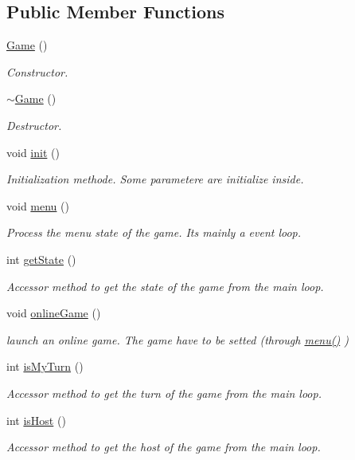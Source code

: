 \subsection*{Public Member Functions}
\begin{DoxyCompactItemize}
\item 
\hyperlink{class_game_ad59df6562a58a614fda24622d3715b65}{Game} ()
\begin{DoxyCompactList}\small\item\em Constructor. \end{DoxyCompactList}\item 
\hyperlink{class_game_ae3d112ca6e0e55150d2fdbc704474530}{$\sim$\+Game} ()
\begin{DoxyCompactList}\small\item\em Destructor. \end{DoxyCompactList}\item 
void \hyperlink{class_game_a6f3a33940524b6ba9d83f627ccb14bbf}{init} ()
\begin{DoxyCompactList}\small\item\em Initialization methode. Some parametere are initialize inside. \end{DoxyCompactList}\item 
void \hyperlink{class_game_a463932fa7ca2f1ce243279bf2422fc48}{menu} ()
\begin{DoxyCompactList}\small\item\em Process the \textquotesingle{}menu\textquotesingle{} state of the game. It\textquotesingle{}s mainly a event loop. \end{DoxyCompactList}\item 
int \hyperlink{class_game_a80324d4742c70ca5b52171382cfb2327}{get\+State} ()
\begin{DoxyCompactList}\small\item\em Accessor method to get the state of the game from the main loop. \end{DoxyCompactList}\item 
void \hyperlink{class_game_adc94b469c429df61f845891b45805061}{online\+Game} ()
\begin{DoxyCompactList}\small\item\em launch an online game. The game have to be setted (through \hyperlink{class_game_a463932fa7ca2f1ce243279bf2422fc48}{menu()} ) \end{DoxyCompactList}\item 
int \hyperlink{class_game_ac978133ca5e0a54ab72f8c1da13e9fbd}{is\+My\+Turn} ()
\begin{DoxyCompactList}\small\item\em Accessor method to get the turn of the game from the main loop. \end{DoxyCompactList}\item 
int \hyperlink{class_game_a6e10e827638cabd577ce12ab68497d31}{is\+Host} ()
\begin{DoxyCompactList}\small\item\em Accessor method to get the host of the game from the main loop. \end{DoxyCompactList}\end{DoxyCompactItemize}
